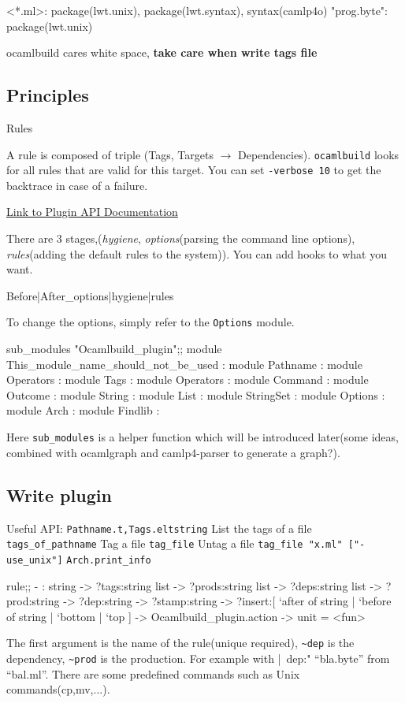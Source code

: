 \begin{bashcode}
<*.ml>: package(lwt.unix), package(lwt.syntax), syntax(camlp4o)
"prog.byte": package(lwt.unix)
\end{bashcode}

ocamlbuild cares white space, \textbf{ take care when write tags file}

\subsection{Principles}
Rules 

A rule is composed of triple (Tags, Targets $\rightarrow$ Dependencies).
\verb|ocamlbuild| looks for all rules that are valid for this target.
You can set \verb|-verbose 10| to get the backtrace in case of a
failure.

\href{http://nicolaspouillard.fr/ocamlbuild/html/Signatures.PLUGIN.html}{Link
  to Plugin API Documentation}

There are 3 stages,(\textit{hygiene}, \textit{options}(parsing the
command line options), \textit{rules}(adding the default rules to the
system)). You can add hooks to what you want.

\begin{bashcode}
{Before|After}_{options|hygiene|rules}
\end{bashcode}

To change the options, simply refer to the \verb|Options| module.

\begin{ocamlcode}
sub_modules "Ocamlbuild_plugin";;
module This_module_name_should_not_be_used :
    module Pathname :
        module Operators :
    module Tags :
        module Operators :
    module Command :
    module Outcome :
    module String :
    module List :
    module StringSet :
    module Options :
    module Arch :
    module Findlib :  
\end{ocamlcode}
Here \verb|sub_modules| is a helper function which will be introduced
later(some ideas, combined with ocamlgraph and camlp4-parser to
generate a graph?).  


\subsection{Write plugin}
Useful API: \verb|Pathname.t,Tags.eltstring| List the tags of a file
\verb|tags_of_pathname| Tag a file \verb|tag_file| Untag a file
\verb|tag_file "x.ml" ["-use_unix"]| \verb|Arch.print_info|

\begin{ocamlcode}
rule;;
- : string ->
    ?tags:string list ->
    ?prods:string list ->
    ?deps:string list ->
    ?prod:string ->
    ?dep:string ->
    ?stamp:string ->
    ?insert:[ `after of string | `before of string | `bottom | `top ] ->
    Ocamlbuild_plugin.action -> unit
= <fun>
\end{ocamlcode}
The first argument is the name of the rule(unique required),
\verb|~dep| is the dependency, \verb|~prod| is the production. For
example with |~dep:"%
``bla.byte'' from ``bal.ml''. There are some predefined commands such
as Unix commands(cp,mv,...).


